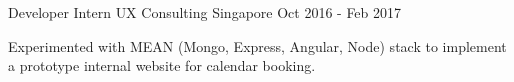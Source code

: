 

\begin{cventries}

  \cventry
    {Developer Intern} %
    {UX Consulting} %
    {Singapore} %
    {Oct 2016 - Feb 2017} %
    {
      \begin{cvitems} %
        \item {Experimented with MEAN (Mongo, Express, Angular, Node) stack to implement a prototype internal website for calendar booking.}
      \end{cvitems}
    }

\end{cventries}
